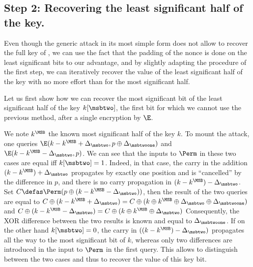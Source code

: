 \subsection{Step 2: Recovering the least significant half of the key.}
\label{sec:reco_lsb}

Even though the generic attack in its most simple form does not allow to recover the full key
of \proestotr,
we can use the fact that the padding of the nonce is done on the least significant
bits to our advantage, and by slightly adapting the procedure of the first step, we can iteratively recover the value
of the least significant half of the key with no more effort than for the most significant half.

Let us first show how we can recover the most significant bit of the least significant half of
the key $k[\msbtwo]$, \ie the first bit for which we cannot use the previous method,
after a single encryption by $\E$. 

We note $k^\MSB$ the known most significant half of the key $k$.
To mount the attack, one queries $\E(k - k^\MSB + \Delta_\msbtwo, p \oplus \Delta_{\msbtwoone})$ and
$\E(k - k^\MSB - \Delta_\msbtwo, p)$. We can see that the inputs to $\Perm$ in these two cases are equal
iff $k[\msbtwo] = 1$. Indeed, in that case,
the carry in the addition $(k - k^\MSB) + \Delta_\msbtwo$ propagates by exactly one position and is ``cancelled'' by
the difference in $p$, and there is no carry propagation in $(k - k^\MSB) - \Delta_\msbtwo$.
Set $C \defas \Perm(p \oplus (k - k^\MSB - \Delta_\msbtwo))$, then
the result of the two queries are equal to
$C \oplus (k - k^\MSB + \Delta_\msbtwo) = C \oplus (k \oplus k^\MSB \oplus \Delta_\msbtwo \oplus \Delta_\msbtwoone)$ and
$C \oplus (k - k^\MSB - \Delta_\msbtwo) = C \oplus (k \oplus k^\MSB \oplus \Delta_\msbtwo)$
Consequently, the XOR difference between the two results is known and equal to $\Delta_\msbtwoone$.
If on the other hand
$k[\msbtwo] = 0$, the carry in $((k - k^\MSB) - \Delta_\msbtwo)$ propagates all the way to the most significant bit of $k$, whereas only
two differences are introduced in the input to $\Perm$ in the first query. This allows to distinguish between the two cases and thus to recover the value of this key bit.

